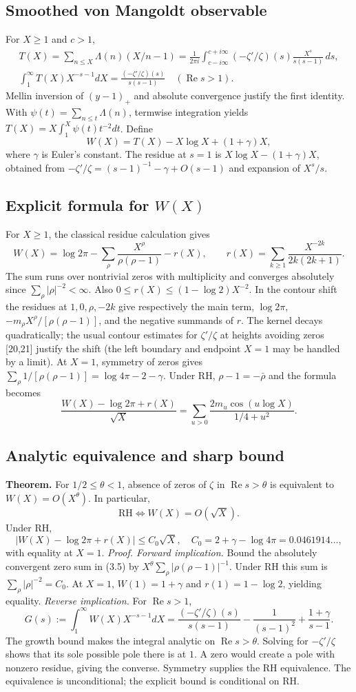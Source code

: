 \documentclass[11pt,a4paper]{article}
\renewcommand{\Re}{\operatorname{Re}}
\newcommand{\RH}{\mathrm{RH}}
\begin{document}
\subsection{Smoothed von Mangoldt observable}
For $X\ge1$ and $c>1$,
\begin{gather*}T(X)=\sum_{n\le X}\Lambda(n)(X/n-1)=\frac1{2\pi i}\int_{c-i\infty}^{c+i\infty}(-\zeta'/\zeta)(s)\frac{X^s}{s(s-1)}\,ds,\\
\int_1^\infty T(X)X^{-s-1}dX=\frac{(-\zeta'/\zeta)(s)}{s(s-1)}\quad(\Re s>1).\end{gather*}
Mellin inversion of $(y-1)_+$ and absolute convergence justify the first identity. With $\psi(t)=\sum_{n\le t}\Lambda(n)$, termwise integration yields $T(X)=X\int_1^X\psi(t)t^{-2}dt$. Define
\[W(X)=T(X)-X\log X+(1+\gamma)X,\]
where $\gamma$ is Euler's constant. The residue at $s=1$ is $X\log X-(1+\gamma)X$, obtained from $-\zeta'/\zeta=(s-1)^{-1}-\gamma+O(s-1)$ and expansion of $X^s/s$.
\subsection{Explicit formula for $W(X)$}
For $X\ge1$, the classical residue calculation gives
\[W(X)=\log2\pi-\sum_\rho\frac{X^\rho}{\rho(\rho-1)}-r(X),\qquad r(X)=\sum_{k\ge1}\frac{X^{-2k}}{2k(2k+1)}.\tag{3.5}\]
The sum runs over nontrivial zeros with multiplicity and converges absolutely since $\sum_\rho|\rho|^{-2}<\infty$. Also $0\le r(X)\le(1-\log2)X^{-2}$. In the contour shift the residues at $1,0,\rho,-2k$ give respectively the main term, $\log2\pi$, $-m_\rho X^\rho/[\rho(\rho-1)]$, and the negative summands of $r$. The kernel decays quadratically; the usual contour estimates for $\zeta'/\zeta$ at heights avoiding zeros [20,21] justify the shift (the left boundary and endpoint $X=1$ may be handled by a limit). At $X=1$, symmetry of zeros gives $\sum_\rho 1/[\rho(\rho-1)]=\log4\pi-2-\gamma$.
Under RH, $\rho-1=-\bar\rho$ and the formula becomes
\[\frac{W(X)-\log2\pi+r(X)}{\sqrt X}=\sum_{u>0}\frac{2m_u\cos(u\log X)}{1/4+u^2}.\tag{3.5$'$}\]
\subsection{Analytic equivalence and sharp bound}
\textbf{Theorem.} For $1/2\le\theta<1$, absence of zeros of $\zeta$ in $\Re s>\theta$ is equivalent to $W(X)=O(X^\theta)$. In particular,
\[\RH\iff W(X)=O(\sqrt X).\]
Under RH,
\[|W(X)-\log2\pi+r(X)|\le C_0\sqrt X,\quad C_0=2+\gamma-\log4\pi=0.0461914\ldots,\tag{3.6}\]
with equality at $X=1$.
\emph{Proof. Forward implication.} Bound the absolutely convergent zero sum in (3.5) by $X^\theta\sum_\rho|\rho(\rho-1)|^{-1}$. Under RH this sum is $\sum_\rho|\rho|^{-2}=C_0$. At $X=1$, $W(1)=1+\gamma$ and $r(1)=1-\log2$, yielding equality.
\emph{Reverse implication.} For $\Re s>1$,
\[G(s):=\int_1^\infty W(X)X^{-s-1}dX=\frac{(-\zeta'/\zeta)(s)}{s(s-1)}-\frac1{(s-1)^2}+\frac{1+\gamma}{s-1}.\]
The growth bound makes the integral analytic on $\Re s>\theta$. Solving for $-\zeta'/\zeta$ shows that its sole possible pole there is at $1$. A zero would create a pole with nonzero residue, giving the converse. Symmetry supplies the RH equivalence. The equivalence is unconditional; the explicit bound is conditional on RH.
\end{document}
